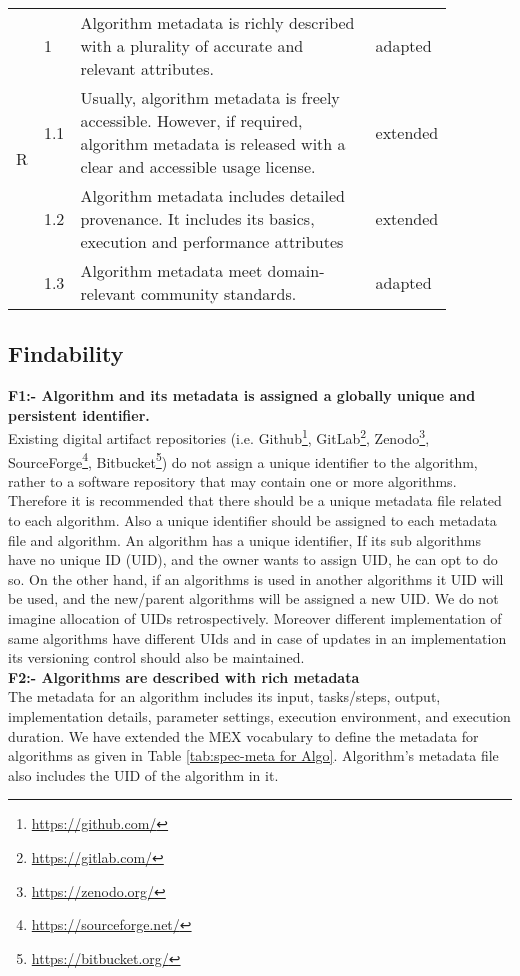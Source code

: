 \documentclass[preprint,12pt]{elsarticle}
\begin{document}
\begin{table*}[!t]
\begin{tabular}{|p{0.05\linewidth}|p{0.05\linewidth}|p{0.67\linewidth}|p{0.1\linewidth}|}
\multirow{4}{*}{R} & 1 & Algorithm metadata is richly described with a plurality of accurate and relevant attributes. & adapted  \\
\cline{2-4}
 & 1.1 & Usually, algorithm metadata is freely accessible. However, if required, algorithm metadata is released with a clear and accessible usage license. & extended\\
\cline{2-4}
 & 1.2 & Algorithm metadata includes detailed provenance. It includes its basics, execution and performance attributes & extended  \\
\cline{2-4}
 & 1.3 & Algorithm metadata meet domain-relevant community standards. & adapted \\
\hline

\end{tabular}
\end{table*}

\subsection{Findability}
\textbf{F1:- Algorithm and its metadata is assigned a globally unique and persistent identifier.}\\
Existing digital artifact repositories (i.e. Github\footnote{\url{https://github.com/}},
GitLab\footnote{\url{https://gitlab.com/}}, Zenodo\footnote{\url{https://zenodo.org/}},  
SourceForge\footnote{\url{https://sourceforge.net/}}, 
Bitbucket\footnote{\url{https://bitbucket.org/}}) do not assign a unique identifier to the algorithm, rather to a software repository that may contain one or more algorithms. Therefore it is recommended that there should be a unique metadata file related to each algorithm. Also a unique identifier should be assigned to each metadata file and algorithm. An algorithm has a unique identifier, 
If its sub algorithms have no unique ID (UID), and the owner wants to assign UID, he can opt to do so. On the other hand, if an algorithms is used in another algorithms it UID will be used, and the new/parent algorithms will be assigned a new UID. We do not imagine allocation of UIDs retrospectively. Moreover different implementation of same algorithms have different UIds and in case of updates in an implementation its versioning control should also be maintained.\\

\textbf{F2:- Algorithms are described with rich metadata}\\
The metadata for an algorithm includes its input, tasks/steps, output, implementation details, parameter settings, execution environment, and execution duration. We have extended the MEX vocabulary \cite{esteves2015mex} to define the metadata for algorithms as given in Table \ref{tab:spec-meta for Algo}. Algorithm's metadata file also includes the UID of the algorithm in it. 
\end{document}
